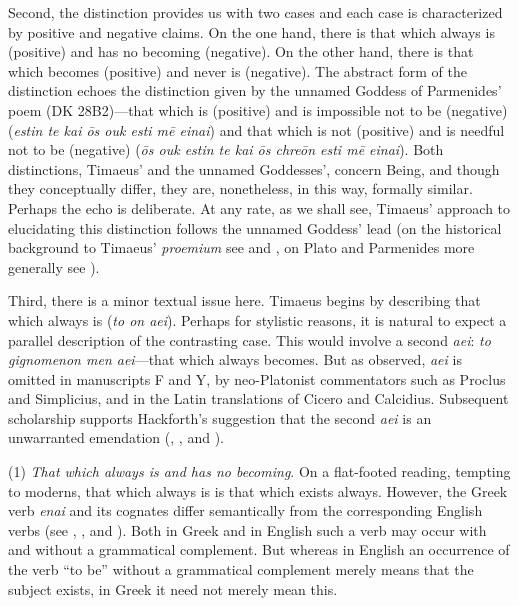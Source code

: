 Second, the distinction provides us with two cases and each case is characterized by positive and negative claims. On the one hand, there is that which always is (positive) and has no becoming (negative). On the other hand, there is that which becomes (positive) and never is (negative). The abstract form of the distinction echoes the distinction given by the unnamed Goddess of Parmenides' poem (DK 28B2)---that which is (positive) and is impossible not to be (negative) (\emph{estin te kai ōs ouk esti mē einai}) and that which is not (positive) and is needful not to be (negative) (\emph{ōs ouk estin te kai ōs chreōn esti mē einai}). Both distinctions, Timaeus' and the unnamed Goddesses', concern Being, and though they conceptually differ, they are, nonetheless, in this way, formally similar. Perhaps the echo is deliberate. At any rate, as we shall see, Timaeus' approach to elucidating this distinction follows the unnamed Goddess' lead (on the historical background to Timaeus' \emph{proemium} see \citealt{Naddaf:1997jt} and \citealt{Runia:1997vz}, on Plato and Parmenides more generally see \citealt{Palmer:1999uq}).

Third, there is a minor textual issue here. Timaeus begins by describing that which always is (\emph{to on aei}). Perhaps for stylistic reasons, it is natural to expect a parallel description of the contrasting case. This would involve a second \emph{aei}: \emph{to gignomenon men aei}---that which always becomes. But as \citet{Hackforth:1959dj} observed, \emph{aei} is omitted in manuscripts F and Y, by neo-Platonist commentators such as Proclus and Simplicius, and in the Latin translations of Cicero and Calcidius. Subsequent scholarship supports Hackforth's suggestion that the second \emph{aei} is an unwarranted emendation (\citealt{Whittaker:1969mq,Whittaker:1973nz}, \citealt{Robinson:1979wk}, and \citealt{Dillon:1989hc}). 

(1) \emph{That which always is and has no becoming}. On a flat-footed reading, tempting to moderns, that which always is is that which exists always. However, the Greek verb \emph{enai} and its cognates differ semantically from the corresponding English verbs (see \citealt{Kahn:2009kx}, \citealt{Brown:1994aa}, and \citealt{Leigh:2008aa}). Both in Greek and in English such a verb may occur with and without a grammatical complement. But whereas in English an occurrence of the verb ``to be'' without a grammatical complement merely means that the subject exists, in Greek it need not merely mean this. 

